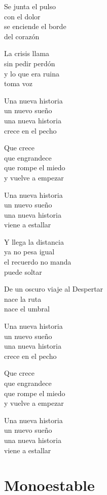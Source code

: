 \begin{lyrics}
Se junta el pulso\\
con el dolor\\
se enciende el borde\\
del corazón

La crisis llama\\
sin pedir perdón\\
y lo que era ruina\\
toma voz

Una nueva historia\\
un nuevo sueño\\
una nueva historia\\
crece en el pecho

Que crece\\
que engrandece\\
que rompe el miedo\\
y vuelve a empezar

Una nueva historia\\
un nuevo sueño\\
una nueva historia\\
viene a estallar

Y llega la distancia\\
ya no pesa igual\\
el recuerdo no manda\\
puede soltar

De un oscuro viaje al Despertar\\
nace la ruta\\
nace el umbral

Una nueva historia\\
un nuevo sueño\\
una nueva historia\\
crece en el pecho

Que crece\\
que engrandece\\
que rompe el miedo\\
y vuelve a empezar

Una nueva historia\\
un nuevo sueño\\
una nueva historia\\
viene a estallar
\end{lyrics}

\section{Monoestable}

